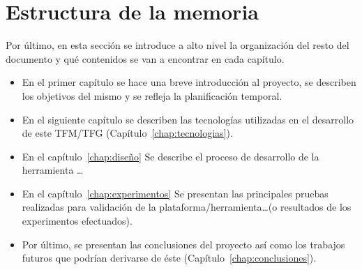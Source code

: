 \section{Estructura de la memoria}
\label{sec:estructura}

Por último, en esta sección se introduce a alto nivel la organización del resto del documento
y qué contenidos se van a encontrar en cada capítulo.

\begin{itemize}
    \item En el primer capítulo se hace una breve introducción al proyecto, se describen los objetivos del mismo y se refleja la planificación temporal.
    \item En el siguiente capítulo se describen las tecnologías utilizadas en el desarrollo de este TFM/TFG (Capítulo~\ref{chap:tecnologias}).
    \item En el capítulo~\ref{chap:diseño} Se describe el proceso de desarrollo
    de la herramienta \ldots
    \item En el capítulo~\ref{chap:experimentos} Se presentan las principales pruebas realizadas
    para validación de la plataforma/herramienta\ldots (o resultados de los experimentos
    efectuados).
    \item Por último, se presentan las conclusiones del proyecto así como los trabajos futuros que podrían derivarse de éste (Capítulo~\ref{chap:conclusiones}).
\end{itemize}
